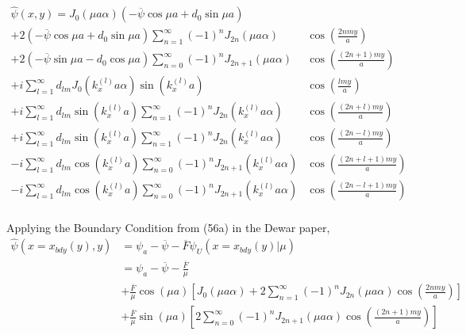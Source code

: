 \documentclass{article}
\begin{document}
\begin{equation}
    \label{eq:eq64bdy2mode}
    \begin{split}
        \hat{\psi}(x,y) = J_0\left( \mu a \alpha \right)\left(-\overline{\psi}\cos{\mu a} + d_0\sin{\mu a} \right)& \\
        + 2\left(-\overline{\psi}\cos{\mu a} + d_0\sin{\mu a} \right) \sum_{n=1}^{\infty} (-1)^n J_{2n} \left( \mu a \alpha \right) &\cos\left( \frac{2nmy}{a} \right) \\
        + 2\left(-\overline{\psi}\sin{\mu a} - d_0\cos{\mu a} \right) \sum_{n=0}^{\infty}(-1)^{n}J_{2n+1}\left(\mu a \alpha \right)&\cos\left( \frac{(2n+1)my}{a}\right) \\
        +i \sum_{l=1}^{\infty} d_{lm}J_0\left( k_x^{(l)} a \alpha \right)\sin\left( k_x^{(l)} a \right) &\cos\left( \frac{lmy}{a} \right) \\
        +i \sum_{l=1}^{\infty} d_{lm}\sin\left( k_x^{(l)} a \right) \sum_{n=1}^{\infty} (-1)^n J_{2n} \left( k_x^{(l)} a \alpha \right) &\cos\left( \frac{(2n+l)my}{a} \right) \\
        +i \sum_{l=1}^{\infty} d_{lm}\sin\left( k_x^{(l)} a \right) \sum_{n=1}^{\infty} (-1)^n J_{2n} \left( k_x^{(l)} a \alpha \right) &\cos\left( \frac{(2n-l)my}{a} \right) \\
        -i \sum_{l=1}^{\infty} d_{lm}\cos\left( k_x^{(l)} a \right) \sum_{n=0}^{\infty}(-1)^{n}J_{2n+1}\left( k_x^{(l)  } a \alpha \right)&\cos\left( \frac{(2n+l+1)my}{a}\right) \\
        -i \sum_{l=1}^{\infty} d_{lm}\cos\left( k_x^{(l)} a \right) \sum_{n=0}^{\infty}(-1)^{n}J_{2n+1}\left( k_x^{(l)  } a \alpha \right)&\cos\left( \frac{(2n-l+1)my}{a}\right) \\
    \end{split}
\end{equation} 

Applying the Boundary Condition from (56a) in the Dewar paper,
\begin{equation}
    \begin{split}
        \hat{\psi}(x=x_{bdy}(y),y)&=\psi_a -\overline{\psi} -\overline{F}\psi_U(x=x_{bdy}(y)|\mu) \\
                                  &=\psi_a -\overline{\psi} -\frac{\overline{F}}{\mu} \\
                                  &+\frac{\overline{F}}{\mu}\cos\left( \mu a \right) \left[ J_0(\mu a \alpha) + 2\sum_{n=1}^{\infty} (-1)^n J_{2n}(\mu a \alpha) \cos\left( \frac{2nmy}{a} \right)\right] \\
                                  &+\frac{\overline{F}}{\mu}\sin\left( \mu a \right) \left[2 \sum_{n=0}^{\infty} (-1)^n J_{2n+1}(\mu a \alpha) \cos\left(\frac{(2n+1)my}{a}\right)\right]
    \end{split}
\end{equation} 
\end{document}
